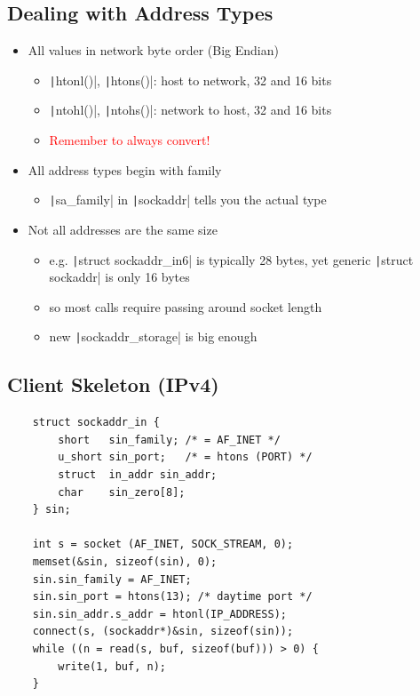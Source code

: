 \subsection{Dealing with Address Types}
\begin{itemize}[nosep]
    \item All values in network byte order (Big Endian)
          \begin{itemize}[nosep]
              \item \texttt|htonl()|, \texttt|htons()|: host to network, 32 and 16 bits
              \item \texttt|ntohl()|, \texttt|ntohs()|: network to host, 32 and 16 bits
              \item \textcolor{red}{Remember to always convert!}
          \end{itemize}
    \item All address types begin with family
          \begin{itemize}[nosep]
              \item \texttt|sa_family| in \texttt|sockaddr| tells you the actual type
          \end{itemize}
    \item Not all addresses are the same size
          \begin{itemize}[nosep]
              \item e.g. \texttt|struct sockaddr_in6| is typically 28 bytes, yet generic \texttt|struct sockaddr| is only 16 bytes
              \item so most calls require passing around socket length
              \item new \texttt|sockaddr_storage| is big enough
          \end{itemize}
\end{itemize}
\subsection{Client Skeleton (IPv4)}
\begin{verbatim}
    struct sockaddr_in {
        short   sin_family; /* = AF_INET */
        u_short sin_port;   /* = htons (PORT) */
        struct  in_addr sin_addr;
        char    sin_zero[8];
    } sin;

    int s = socket (AF_INET, SOCK_STREAM, 0);
    memset(&sin, sizeof(sin), 0);
    sin.sin_family = AF_INET;
    sin.sin_port = htons(13); /* daytime port */
    sin.sin_addr.s_addr = htonl(IP_ADDRESS);
    connect(s, (sockaddr*)&sin, sizeof(sin));
    while ((n = read(s, buf, sizeof(buf))) > 0) {
        write(1, buf, n);
    }
\end{verbatim}
